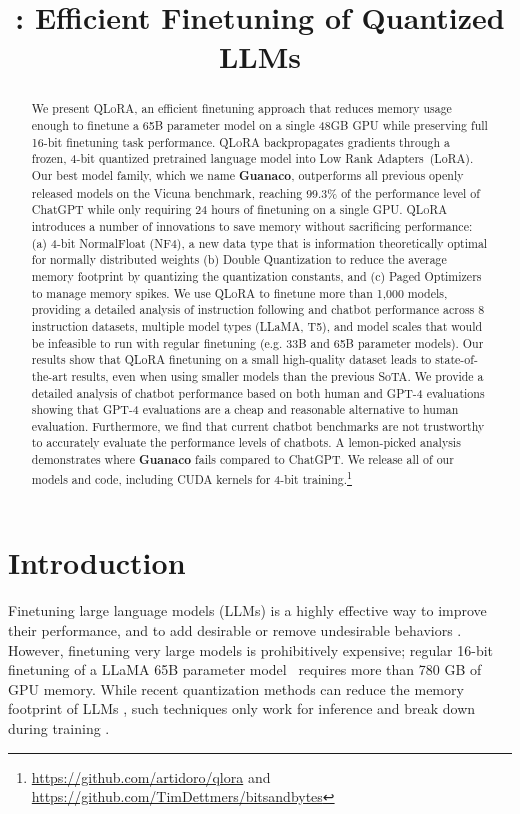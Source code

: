 \title{: Efficient Finetuning of Quantized LLMs}

\begin{abstract}
We present \textsc{QLoRA}, an efficient finetuning approach that reduces memory usage enough to finetune a 65B parameter model on a single 48GB GPU while preserving full 16-bit finetuning task performance. \textsc{QLoRA} backpropagates gradients through a frozen, 4-bit quantized pretrained language model into Low Rank Adapters~(LoRA). Our best model family, which we name \textbf{Guanaco}, outperforms all previous openly released models on the Vicuna benchmark, reaching 99.3\% of the performance level of ChatGPT while only requiring 24 hours of finetuning on a single GPU. \textsc{QLoRA} introduces a number of innovations to save memory without sacrificing performance: (a) 4-bit NormalFloat (NF4), a new data type that is information theoretically optimal for normally distributed weights (b) Double Quantization to reduce the average memory footprint by quantizing the quantization constants, and (c) Paged Optimizers to manage memory spikes. We use \textsc{QLoRA} to finetune more than 1,000 models, providing a detailed analysis of instruction following and chatbot performance across 8 instruction datasets, multiple model types (LLaMA, T5), and model scales that would be infeasible to run with regular finetuning (e.g. 33B and 65B parameter models). Our results show that QLoRA finetuning on a small high-quality dataset leads to state-of-the-art results, even when using smaller models than the previous SoTA. We provide a detailed analysis of chatbot performance based on both human and GPT-4 evaluations showing that GPT-4 evaluations are a cheap and reasonable alternative to human evaluation. Furthermore, we find that current chatbot benchmarks are not trustworthy to accurately evaluate the performance levels of chatbots. A lemon-picked analysis demonstrates where \textbf{Guanaco} fails compared to ChatGPT. We release all of our models and code, including CUDA kernels for 4-bit training.\footnote{\url{https://github.com/artidoro/qlora} and \url{https://github.com/TimDettmers/bitsandbytes}}
\end{abstract}

\section{Introduction}

Finetuning large language models (LLMs) is a highly effective way to improve their performance, \citep{min2021metaicl, wei2021finetuned, ouyang2022training, wang2022super, wang2022self, liu2022few} and to add desirable or remove undesirable behaviors \citep{ouyang2022training,askell2021general,bai2022training}. However, finetuning very large models is prohibitively expensive; regular 16-bit finetuning of a LLaMA 65B parameter model~\citep{touvron2023llama} requires more than 780 GB of GPU memory. While recent quantization methods can reduce the memory footprint of LLMs \citep{dettmers2022llm, dettmers2022case, frantar2022gptq, xiao2022smoothquant}, such techniques only work for inference and break down during training \citep{wortsman2023stable}. 

